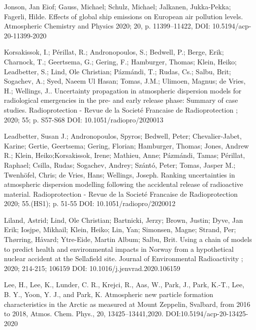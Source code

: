 \begin{list}{}{\setlength{\leftmargin}{15pt}\setlength{\itemindent}{-\leftmargin}}
\item[]
Jonson, Jan Eiof; Gauss, Michael; Schulz, Michael; Jalkanen, Jukka-Pekka; Fagerli, Hilde.
Effects of global ship emissions on European air pollution levels.
Atmospheric Chemistry and Physics 2020; 20, p. 11399–11422,
DOI: 10.5194/acp-20-11399-2020

\item[]
Korsakissok, I.; Périllat, R.; Andronopoulos, S.; Bedwell, P.; Berge, Erik; Charnock, T.; Geertsema, G.; Gering, F.; Hamburger, Thomas; Klein, Heiko; Leadbetter, S.; Lind, Ole Christian; Pázmándi, T.; Rudas, Cs.; Salbu, Brit; Sogachev, A.; Syed, Naeem Ul Hasan; Tomas, J.M.; Ulimoen, Magnus; de Vries, H.; Wellings, J..
Uncertainty propagation in atmospheric dispersion models for radiological emergencies in the pre- and early release phase: Summary of case studies.
Radioprotection - Revue de la Societé Francaise de Radioprotection ; 2020; 55; p. S57-S68
DOI: 10.1051/radiopro/2020013 

\item[]
Leadbetter, Susan J.; Andronopoulos, Spyros; Bedwell, Peter; Chevalier-Jabet, Karine; Gertie, Geertsema; Gering, Florian; Hamburger, Thomas; Jones, Andrew R.; Klein, Heiko;Korsakissok, Irene; Mathieu, Anne; Pázmándi, Tamas; Périllat, Raphael; Csilla, Rudas; Sogachev, Andrey; Szántó, Peter; Tomas, Jasper M.; Twenhöfel, Chris; de Vries, Hans; Wellings, Joseph.
Ranking uncertainties in atmospheric dispersion modelling following the accidental release of radioactive material.
Radioprotection - Revue de la Societé Francaise de Radioprotection 2020; 55.(HS1); p. 51-55
DOI: 10.1051/radiopro/2020012 

\item[]
Liland, Astrid; Lind, Ole Christian; Bartnicki, Jerzy; Brown, Justin; Dyve, Jan Erik; Iosjpe, Mikhail; Klein, Heiko; Lin, Yan; Simonsen, Magne; Strand, Per; Thørring, Håvard; Ytre-Eide, Martin Album; Salbu, Brit.
Using a chain of models to predict health and environmental impacts in Norway from a hypothetical nuclear accident at the Sellafield site.
Journal of Environmental Radioactivity ; 2020; 214-215; 106159
DOI: 10.1016/j.jenvrad.2020.106159

\item[]
Lee, H., Lee, K., Lunder, C. R., Krejci, R., Aas, W., Park, J., Park, K.-T., Lee, B. Y., Yoon, Y. J., and Park, K.
Atmospheric new particle formation characteristics in the Arctic as measured at Mount Zeppelin, Svalbard, from 2016 to 2018, 
Atmos. Chem. Phys., 20, 13425–13441,2020.
DOI:10.5194/acp-20-13425-2020


\end{list}
